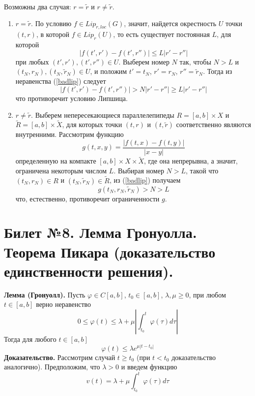 \documentclass{article}
\begin{document}
Возможны два случая: $r = \widetilde{r}$ и $r \neq \widetilde{r}$.
\begin{enumerate}
    \item $r = \widetilde{r}$. По условию $f \in Lip_{r,loc}(G)$, значит, найдется окрестность $U$ точки $(t,r)$, в которой $f \in Lip_r(U)$, то есть существует постоянная $L$, для которой
    \begin{equation*}
        |f(t', r') - f(t', r'')| \le L|r' - r''|
    \end{equation*}
    при любых $(t',r'), (t',r'') \in U$. Выберем номер $N$ так, чтобы $N > L$ и $(t_N, r_N), (t_N, \widetilde{r}_N) \in U$, и положим $t' = t_N$, $r' = r_N$, $r'' = \widetilde{r}_N$. Тогда из неравенства (\ref{badlip}) следует
    \begin{equation*}
        |f(t',r') - f(t',r'')| > N|r' - r''| \ge L|r' - r''|
    \end{equation*}
    что противоречит условию Липшица.
    \item $r \neq \widetilde{r}$. Выберем непересекающиеся параллелепипеды $R = [a,b] \times X$ и $\widetilde{R} = [a,b] \times \widetilde{X}$, для которых точки $(t,r)$ и $(t,\widetilde{r})$ соответственно являются внутренними. Рассмотрим функцию
    \begin{equation*}
        g(t,x,y) = \frac{|f(t,x) - f(t,y)|}{|x - y|}
    \end{equation*}
    определенную на компакте $[a,b] \times X \times \widetilde{X}$, где она непрерывна, а значит, ограничена некоторым числом $L$. Выбирая номер $N > L$, такой что $(t_N, r_N) \in R$ и $(t_N, \widetilde{r}_N) \in \widetilde{R}$, из (\ref{badlip}) получаем
    \begin{equation*}
        g(t_N, r_N, \widetilde{r}_N) > N > L
    \end{equation*}
    что, естественно, противоречит ограниченности $g$.
\end{enumerate}

\section{Билет №8. Лемма Гронуолла. Теорема Пикара (доказательство единственности решения).}
\textbf{Лемма (Гронуолл).} Пусть $\varphi \in C[a,b]$, $t_0 \in [a,b]$, $\lambda, \mu \ge 0$, при любом $t \in [a,b]$ верно неравенство
\begin{equation*}
    0 \le \varphi(t) \le \lambda + \mu \left|\int_{t_0}^t \varphi(\tau)d\tau\right|
\end{equation*}
Тогда для любого $t \in [a,b]$
\begin{equation*}
    \varphi(t) \le \lambda e^{\mu|t - t_0|}
\end{equation*}
\textbf{Доказательство.} Рассмотрим случай $t \ge t_0$ (при $t < t_0$ доказательство аналогично). Предположим, что $\lambda > 0$ и введем функцию
\begin{equation*}
    v(t) = \lambda + \mu \int_{t_0}^t \varphi(\tau)d\tau
\end{equation*}
\end{document}
